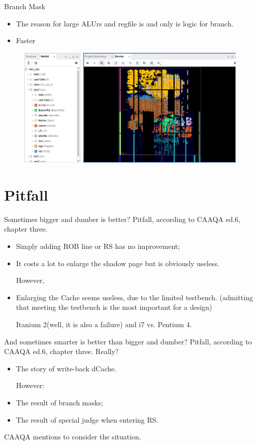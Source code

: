 \documentclass{beamer}
\begin{document}
\begin{frame}{Branch Mask}
    \begin{itemize}
        \item The reason for large ALUrs and regfile is and only is logic for branch. 
        \item Faster
    \end{itemize}
    \begin{figure}
    \includegraphics[width=110mm]{figure.png}
    \end{figure}
\end{frame}

\section{Pitfall}
\begin{frame}{Sometimes bigger and dumber is better?}
    Pitfall, according to CAAQA ed.6, chapter three. 
    \begin{itemize}
        \item Simply adding ROB line or RS has no improvement; 
        \item It costs a lot to enlarge the shadow page but is obviously useless. 
        
        However, 
        
        \item Enlarging the Cache seems useless, due to the limited testbench. 
        (admitting that meeting the testbench is the most important for a design)

        Itanium 2(well, it is also a failure) and i7 vs. Pentium 4. 
    \end{itemize}
\end{frame}

\begin{frame}{And sometimes smarter is better than bigger and dumber?}
    Pitfall, according to CAAQA ed.6, chapter three. Really? 
\begin{itemize}
    \item The story of write-back dCache. 
    
    However: 

    \item The result of branch masks; 
    \item The result of special judge when entering RS. 
\end{itemize}
    CAAQA mentions to consider the situation. 
\end{frame}
\end{document}
